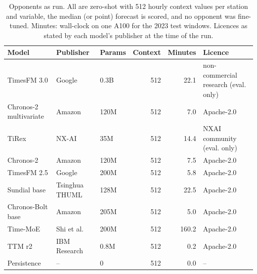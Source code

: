 \begin{table}[H]
\centering\scriptsize
\setlength{\tabcolsep}{4pt}
\caption{Opponents as run. All are zero-shot with 512 hourly context values per station and variable, the median (or point) forecast is scored, and no opponent was fine-tuned. Minutes: wall-clock on one A100 for the 2023 test windows. Licences as stated by each model's publisher at the time of the run.}
\label{tab:opp}
\begin{tabular}{lllrrl}
\toprule
Model & Publisher & Params & Context & Minutes & Licence\\
\midrule
TimesFM 3.0 & Google & 0.3B & 512 & 22.1 & non-commercial research (eval. only)\\
Chronos-2 multivariate & Amazon & 120M & 512 & 7.0 & Apache-2.0\\
TiRex & NX-AI & 35M & 512 & 14.4 & NXAI community (eval. only)\\
Chronos-2 & Amazon & 120M & 512 & 7.5 & Apache-2.0\\
TimesFM 2.5 & Google & 200M & 512 & 5.8 & Apache-2.0\\
Sundial base & Tsinghua THUML & 128M & 512 & 22.5 & Apache-2.0\\
Chronos-Bolt base & Amazon & 205M & 512 & 5.0 & Apache-2.0\\
Time-MoE & Shi et al. & 200M & 512 & 160.2 & Apache-2.0\\
TTM r2 & IBM Research & 0.8M & 512 & 0.2 & Apache-2.0\\
Persistence & -- & 0 & 512 & 0.0 & --\\
\bottomrule
\end{tabular}
\end{table}
